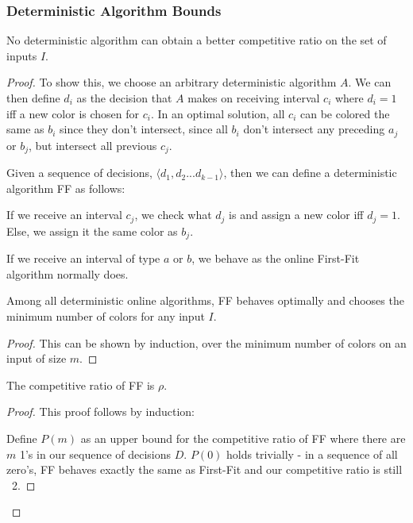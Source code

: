 \subsubsection{Deterministic Algorithm Bounds}
\begin{theorem}
	No deterministic algorithm can obtain a better competitive ratio on the set of inputs $I$.
\end{theorem}
\begin{proof}
To show this, we choose an arbitrary deterministic algorithm $A$. We can then define $d_i$ as the decision that $A$ makes on receiving interval $c_i$ where $d_i = 1$ iff a new color is chosen for $c_i$.  In an optimal solution, all $c_i$ can be colored the same as $b_i$ since they don't intersect, since all $b_i$ don't intersect any preceding $a_j$ or $b_j$, but intersect all previous $c_j$.  

Given a sequence of decisions, $\langle d_1, d_2...d_{k-1} \rangle$, then we can define a deterministic algorithm FF as follows:

If we receive an interval $c_j$, we check what $d_j$ is and assign a new color iff $d_j = 1$. Else, we assign it the same color as $b_j$. 

If we receive an interval of type $a$ or $b$, we behave as the online First-Fit algorithm normally does.

\begin{lemma} Among all deterministic online algorithms, FF behaves optimally and chooses the minimum number of colors for any input $I$. \end{lemma}
\begin{proof}
This can be shown by induction, over the minimum number of colors on an input of size $m$. 
\end{proof}

\begin{lemma} The competitive ratio of FF is $\rho$. \end{lemma}
\begin{proof}
This proof follows by induction:

Define $P(m)$ as an upper bound for the competitive ratio of FF where there are $m$ 1's in our sequence of decisions $D$.  $P(0)$ holds trivially - in a sequence of all zero's, FF behaves exactly the same as First-Fit and our competitive ratio is still ~2.


\end{proof}
\end{proof}
